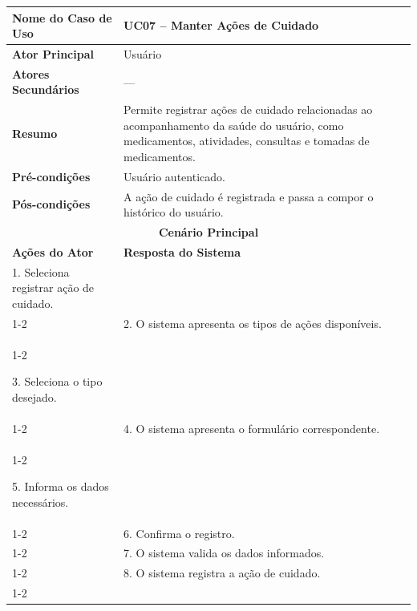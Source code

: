 
\begin{longtable}{| p{} | p{} |}
\hline

\textbf{Nome do Caso de Uso} &
UC07 -- Manter Ações de Cuidado \\
\hline

\textbf{Ator Principal} &
Usuário \\
\hline

\textbf{Atores Secundários} &
--- \\
\hline

\textbf{Resumo} &
Permite registrar ações de cuidado relacionadas ao acompanhamento da
saúde do usuário, como medicamentos, atividades, consultas e tomadas
de medicamentos. \\
\hline

\textbf{Pré-condições} &
Usuário autenticado. \\
\hline

\textbf{Pós-condições} &
A ação de cuidado é registrada e passa a compor o histórico do usuário. \\
\hline

\multicolumn{2}{|c|}{\textbf{Cenário Principal}}\\
\hline

\textbf{Ações do Ator} &
\textbf{Resposta do Sistema} \\
\hline

1. Seleciona registrar ação de cuidado. & \\
\cline{1-2}

&

2. O sistema apresenta os tipos de ações disponíveis. \\

\cline{1-2}

3. Seleciona o tipo desejado. & \\
\cline{1-2}

&
4. O sistema apresenta o formulário correspondente. \\
\cline{1-2}

5. Informa os dados necessários. & \\
\cline{1-2}

&
6. Confirma o registro. \\
\cline{1-2}

&
7. O sistema valida os dados informados. \\
\cline{1-2}

&
8. O sistema registra a ação de cuidado. \\
\cline{1-2}


\end{longtable}
